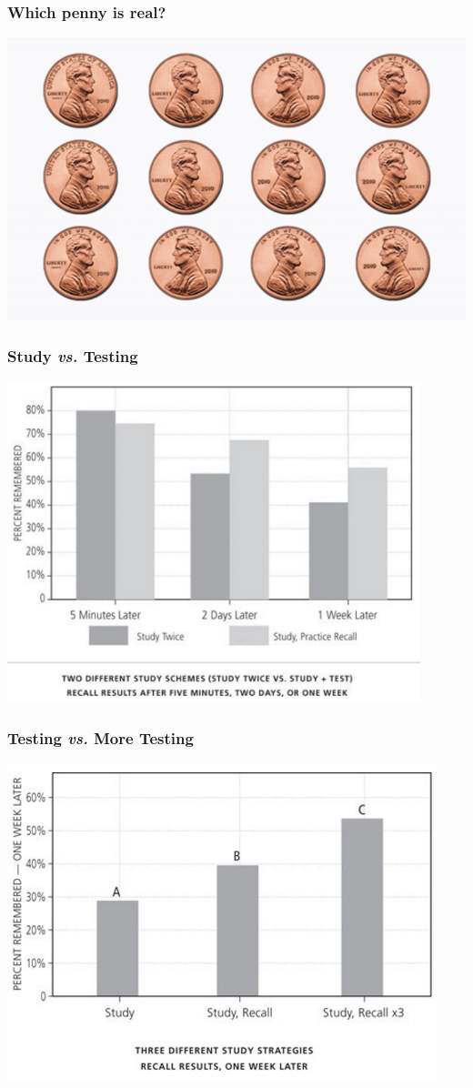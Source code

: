 \documentclass{beamer}
\newcommand{\bfr}[1]{\begin{frame}[fragile]\frametitle{{ #1 }}}
\begin{document}
\bfr{Which penny is real?}
\includegraphics[width=\textwidth]{pennymemorytest.jpg}
\end{frame}

\bfr{Study {\em vs.} Testing}
\includegraphics[width=0.9\textwidth]{studyvstest.png}
\end{frame}

\bfr{Testing {\em vs.} More Testing}
\includegraphics[width=\textwidth]{test3times.png}
\end{frame}
\end{document}
